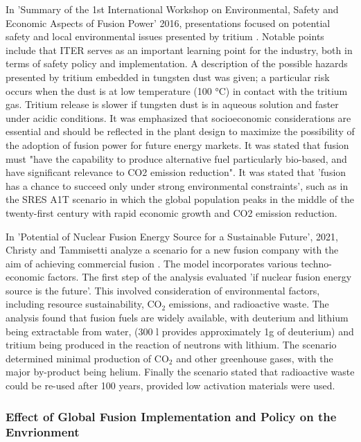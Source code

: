 In 'Summary of the 1st International Workshop on Environmental, Safety and Economic Aspects of Fusion Power' 2016, presentations focused on potential safety and local environmental issues presented by tritium \cite{wu2016summary}. Notable points include that ITER serves as an important learning point for the industry, both in terms of safety policy and implementation. A description of the possible hazards presented by tritium embedded in tungsten dust was given; a particular risk occurs when the dust is at low temperature (100 °C) in contact with the tritium gas. Tritium release is slower if tungsten dust is in aqueous solution and faster under acidic conditions. It was emphasized that socioeconomic considerations are essential and should be reflected in the plant design to maximize the possibility of the adoption of fusion power for future energy markets. It was stated that fusion must "have the capability to produce alternative fuel particularly bio-based, and have significant relevance to CO2 emission reduction". It was stated that 'fusion has a chance to succeed only under strong environmental constraints', such as in the SRES A1T scenario in which the global population peaks in the middle of the twenty-first century with rapid economic growth and CO2 emission reduction.

In 'Potential of Nuclear Fusion Energy Source for a Sustainable Future', 2021, Christy and Tammisetti analyze a scenario for a new fusion company with the aim of achieving commercial fusion \cite{christy2021potential}. The model incorporates various techno-economic factors. The first step of the analysis evaluated 'if nuclear fusion energy source is the future'. This involved consideration of environmental factors, including resource sustainability, CO$_2$ emissions, and radioactive waste. The analysis found that fusion fuels are widely available, with deuterium and lithium being extractable from water, (300 l provides approximately 1g of deuterium) and tritium being produced in the reaction of neutrons with lithium. The scenario determined minimal production of CO$_2$ and other greenhouse gases, with the major by-product being helium. Finally the scenario stated that radioactive waste could be re-used after 100 years, provided low activation materials were used.


\subsubsection{Effect of Global Fusion Implementation and Policy on the Envrionment}
\label{sec:pol}


